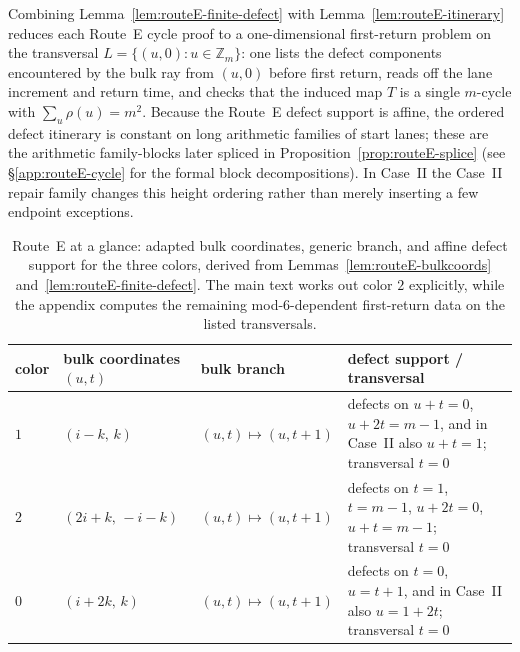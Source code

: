 \documentclass[11pt]{article}
\newcommand{\Zm}{\mathbb Z_m}
\begin{document}
Combining Lemma~\ref{lem:routeE-finite-defect} with Lemma~\ref{lem:routeE-itinerary} reduces each Route~E cycle proof to a one-dimensional first-return problem on the transversal $L=\{(u,0):u\in\Zm\}$: one lists the defect components encountered by the bulk ray from $(u,0)$ before first return, reads off the lane increment and return time, and checks that the induced map $T$ is a single $m$-cycle with $\sum_u\rho(u)=m^2$.
Because the Route~E defect support is affine, the ordered defect itinerary is constant on long arithmetic families of start lanes; these are the arithmetic family-blocks later spliced in Proposition~\ref{prop:routeE-splice} (see \S\ref{app:routeE-cycle} for the formal block decompositions).
In Case~II the Case~II repair family changes this height ordering rather than merely inserting a few endpoint exceptions.

\begin{table}[t]
\centering
\footnotesize
\setlength{\tabcolsep}{4pt}
\begin{tabularx}{\textwidth}{@{}l l l >{\raggedright\arraybackslash}X@{}}
\toprule
color & bulk coordinates $(u,t)$ & bulk branch & defect support / transversal \\
\midrule
$1$ & $(i-k,\,k)$ & $(u,t)\mapsto(u,t+1)$ & defects on $u+t=0$, $u+2t=m-1$, and in Case~II also $u+t=1$; transversal $t=0$ \\
$2$ & $(2i+k,\,-i-k)$ & $(u,t)\mapsto(u,t+1)$ & defects on $t=1$, $t=m-1$, $u+2t=0$, $u+t=m-1$; transversal $t=0$ \\
$0$ & $(i+2k,\,k)$ & $(u,t)\mapsto(u,t+1)$ & defects on $t=0$, $u=t+1$, and in Case~II also $u=1+2t$; transversal $t=0$ \\
\bottomrule
\end{tabularx}
\caption{Route~E at a glance: adapted bulk coordinates, generic branch, and affine defect support for the three colors, derived from Lemmas~\ref{lem:routeE-bulkcoords} and~\ref{lem:routeE-finite-defect}. The main text works out color $2$ explicitly, while the appendix computes the remaining mod-$6$-dependent first-return data on the listed transversals.}
\label{tab:routeE-summary}
\end{table}
\end{document}
